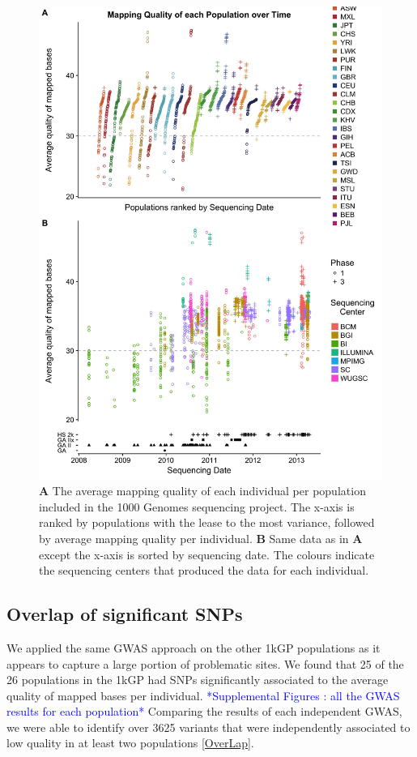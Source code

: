 \documentclass[9pt,lineno]{elife}
\newcommand{\todo}[1]{\textcolor{blue}{*#1*}}
\begin{document}
\begin{figure}
\includegraphics[width=\hsize,keepaspectratio]{MapQualOverTime.jpg}

\caption{\textbf{A} The average mapping quality of each individual per population included in the 1000 Genomes sequencing project. The x-axis is ranked by populations with the lease to the most variance, followed by average mapping quality per individual. \textbf{B} Same data as in \textbf{A} except the x-axis is sorted by sequencing date. The colours indicate the sequencing centers that produced the data for each individual.}
\label{MapQual}
\end{figure}

	\subsection{Overlap of significant SNPs}
We applied the same GWAS approach on the other 1kGP populations as it appears to capture a large portion of problematic sites. 
We found that 25 of the 26 populations in the 1kGP had SNPs significantly associated to the average quality of mapped bases per individual.
\todo{Supplemental Figures : all the GWAS results for each population}
Comparing the results of each independent GWAS, we were able to identify over 3625 variants that were independently associated to low quality in at least two populations  \ref{OverLap}. 
\end{document}
